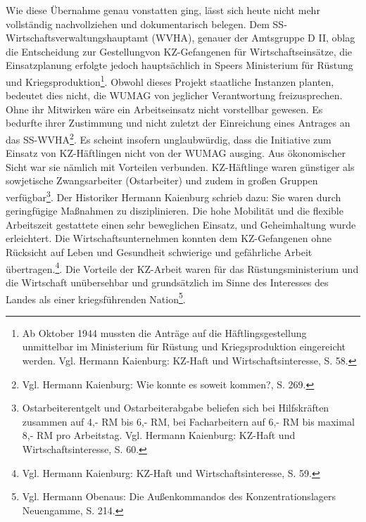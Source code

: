 Wie diese Übernahme genau vonstatten ging, lässt sich heute nicht mehr vollständig nachvollziehen und dokumentarisch belegen. Dem SS-Wirtschaftsverwaltungshauptamt (WVHA), genauer der Amtsgruppe D II, oblag die Entscheidung zur \glqq Gestellung\grqq von KZ-Gefangenen für Wirtschaftseinsätze, die Einsatzplanung erfolgte jedoch hauptsächlich in Speers Ministerium für Rüstung und Kriegsproduktion\footnote{Ab Oktober 1944 mussten die Anträge auf die Häftlingsgestellung unmittelbar im Ministerium für Rüstung und Kriegsproduktion eingereicht werden. Vgl. Hermann Kaienburg: KZ-Haft und Wirtschaftsinteresse, S. 58.}. Obwohl dieses Projekt staatliche Instanzen planten, bedeutet dies nicht, die WUMAG von jeglicher Verantwortung freizusprechen. Ohne ihr Mitwirken wäre ein Arbeitseinsatz nicht vorstellbar gewesen. Es bedurfte ihrer Zustimmung und nicht zuletzt der Einreichung eines Antrages an das SS-WVHA\footnote{Vgl. Hermann Kaienburg: Wie konnte es soweit kommen?, S. 269.}. Es scheint insofern unglaubwürdig, dass die Initiative zum Einsatz von KZ-Häftlingen nicht von der WUMAG ausging. Aus ökonomischer Sicht war sie nämlich mit Vorteilen verbunden. KZ-Häftlinge waren günstiger als sowjetische Zwangsarbeiter (\glqq Ostarbeiter\grqq) und zudem in großen Gruppen verfügbar\footnote{Ostarbeiterentgelt und Ostarbeiterabgabe beliefen sich bei Hilfskräften zusammen auf 4,- RM bis 6,- RM, bei Facharbeitern auf 6,- RM bis maximal 8,- RM pro Arbeitstag. Vgl. Hermann Kaienburg: KZ-Haft und Wirtschaftsinteresse, S. 60.}. Der Historiker Hermann Kaienburg schrieb dazu: \glqq Sie waren durch geringfügige Maßnahmen zu disziplinieren. Die hohe Mobilität und die flexible Arbeitszeit gestattete einen sehr beweglichen Einsatz, und Geheimhaltung wurde erleichtert. Die Wirtschaftsunternehmen konnten dem KZ-Gefangenen ohne Rücksicht auf Leben und Gesundheit schwierige und gefährliche Arbeit übertragen.\grqq\footnote{Vgl. Hermann Kaienburg: KZ-Haft und Wirtschaftsinteresse, S. 59.}. Die Vorteile der KZ-Arbeit waren für das Rüstungsministerium und die Wirtschaft unübersehbar und grundsätzlich im Sinne \glqq des Interesses des Landes als einer kriegsführenden Nation\grqq\footnote{Vgl. Hermann Obenaus: Die Außenkommandos des Konzentrationslagers Neuengamme, S. 214.}.
\newline
